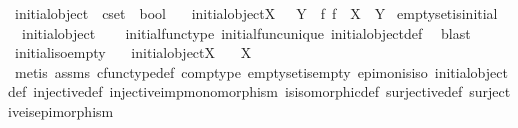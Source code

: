 \begin{isabellebody}
\isanewline
{}\isamarkupfalse%
\ initial{\isacharunderscore}{\kern0pt}object\ {\isacharcolon}{\kern0pt}{\isacharcolon}{\kern0pt}\ {\isachardoublequoteopen}cset\ {\isasymRightarrow}\ bool{\isachardoublequoteclose}\ \isanewline
\ \ {\isachardoublequoteopen}initial{\isacharunderscore}{\kern0pt}object{\isacharparenleft}{\kern0pt}X{\isacharparenright}{\kern0pt}\ {\isasymlongleftrightarrow}\ {\isacharparenleft}{\kern0pt}{\isasymforall}\ Y{\isachardot}{\kern0pt}\ {\isasymexists}{\isacharbang}{\kern0pt}\ f{\isachardot}{\kern0pt}\ f\ {\isacharcolon}{\kern0pt}\ X\ {\isasymrightarrow}\ Y{\isacharparenright}{\kern0pt}{\isachardoublequoteclose}\isanewline
\isanewline
{}\isamarkupfalse%
\ emptyset{\isacharunderscore}{\kern0pt}is{\isacharunderscore}{\kern0pt}initial{\isacharcolon}{\kern0pt}\isanewline
\ \ {\isachardoublequoteopen}initial{\isacharunderscore}{\kern0pt}object{\isacharparenleft}{\kern0pt}{\isasymemptyset}{\isacharparenright}{\kern0pt}{\isachardoublequoteclose}\isanewline
%
\isadelimproof
\ \ %
\endisadelimproof
%
\isatagproof
{}\isamarkupfalse%
\ initial{\isacharunderscore}{\kern0pt}func{\isacharunderscore}{\kern0pt}type\ initial{\isacharunderscore}{\kern0pt}func{\isacharunderscore}{\kern0pt}unique\ initial{\isacharunderscore}{\kern0pt}object{\isacharunderscore}{\kern0pt}def\ \isamarkupfalse%
\ blast%
\endisatagproof
{\isafoldproof}%
%
\isadelimproof
\isanewline
%
\endisadelimproof
\isanewline
{}\isamarkupfalse%
\ initial{\isacharunderscore}{\kern0pt}iso{\isacharunderscore}{\kern0pt}empty{\isacharcolon}{\kern0pt}\isanewline
\ \ \ {\isachardoublequoteopen}initial{\isacharunderscore}{\kern0pt}object{\isacharparenleft}{\kern0pt}X{\isacharparenright}{\kern0pt}{\isachardoublequoteclose}\isanewline
\ \ \ {\isachardoublequoteopen}X\ {\isasymcong}\ {\isasymemptyset}{\isachardoublequoteclose}\isanewline
%
\isadelimproof
\ \ %
\endisadelimproof
%
\isatagproof
{}\isamarkupfalse%
\ {\isacharparenleft}{\kern0pt}metis\ assms\ cfunc{\isacharunderscore}{\kern0pt}type{\isacharunderscore}{\kern0pt}def\ comp{\isacharunderscore}{\kern0pt}type\ emptyset{\isacharunderscore}{\kern0pt}is{\isacharunderscore}{\kern0pt}empty\ epi{\isacharunderscore}{\kern0pt}mon{\isacharunderscore}{\kern0pt}is{\isacharunderscore}{\kern0pt}iso\ initial{\isacharunderscore}{\kern0pt}object{\isacharunderscore}{\kern0pt}def\ injective{\isacharunderscore}{\kern0pt}def\ injective{\isacharunderscore}{\kern0pt}imp{\isacharunderscore}{\kern0pt}monomorphism\ is{\isacharunderscore}{\kern0pt}isomorphic{\isacharunderscore}{\kern0pt}def\ surjective{\isacharunderscore}{\kern0pt}def\ surjective{\isacharunderscore}{\kern0pt}is{\isacharunderscore}{\kern0pt}epimorphism{\isacharparenright}{\kern0pt}%

\end{isabellebody}
